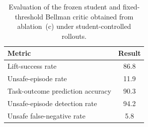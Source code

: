 \begin{table}[H]
  \centering
  \normalsize
  \caption{Evaluation of the frozen student and fixed-threshold Bellman critic
  obtained from ablation~(c) under student-controlled rollouts.}
  \label{tab:bellman_critic_evaluation}
  \setlength{\tabcolsep}{12pt}
  \renewcommand{\arraystretch}{1.14}
  \begin{tabular}{lc}
    \toprule
    Metric & Result \\
    \midrule
    Lift-success rate                   & 86.8 \\
    Unsafe-episode rate                 & 11.9 \\
    Task-outcome prediction accuracy    & 90.3 \\
    Unsafe-episode detection rate       & 94.2 \\
    Unsafe false-negative rate          & 5.8 \\
    \bottomrule
\end{tabular}
\end{table}
